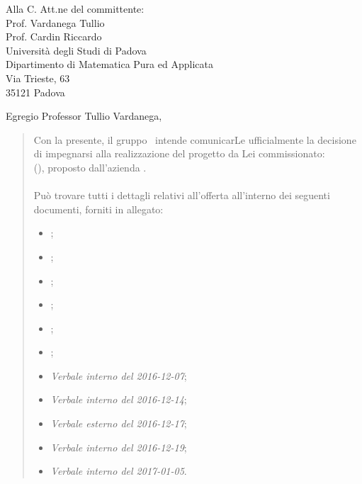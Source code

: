 \documentclass{letter}
\date{Padova, 11 Gennaio 2017}
\begin{document}
\begin{letter}{
	Alla C. Att.ne del committente: \\
	Prof. Vardanega Tullio \\
	Prof. Cardin Riccardo \\
	Università degli Studi di Padova \\
	Dipartimento di Matematica Pura ed Applicata \\
	Via Trieste, 63 \\
	35121 Padova
}


\opening{Egregio Professor Tullio Vardanega,}

\begin{quotation}

	Con la presente, il gruppo \kpanic\ intende comunicarLe ufficialmente la decisione di impegnarsi alla realizzazione del progetto da Lei commissionato: \\
	\textbf{\atavi} (\textbf{\acratavi}), proposto dall'azienda \textbf{\prop}.\\\\
	Può trovare tutti i dettagli relativi all'offerta all'interno dei seguenti documenti, forniti in allegato:\vspace{0.5em}

	\begin{itemize}

		\item \analisideirequisitiv;
		\item \glossariov;
		\item \normediprogettov;
		\item \pianodiprogettov;
		\item \pianodiqualificav;
		\item \studiodifattibilitav;
		\item \emph{Verbale interno del 2016-12-07};
		\item \emph{Verbale interno del 2016-12-14};
		\item \emph{Verbale esterno del 2016-12-17};
		\item \emph{Verbale interno del 2016-12-19};
		\item \emph{Verbale interno del 2017-01-05}.
		\vspace{0.5em}


\end{itemize}
\end{quotation}
\end{letter}
\end{document}
